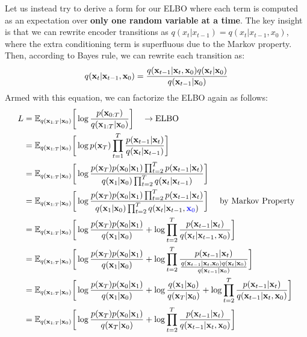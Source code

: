 Let us instead try to derive a form for our ELBO where each term is computed as an expectation over \textbf{only one random variable at a time}. The key insight is that we can rewrite encoder transitions as $q(x_t|x_{t-1}) = q(x_t|x_{t-1}, x_0)$, where the extra conditioning term is superfluous due to the Markov property. Then, according to Bayes rule, we can rewrite each transition as:
\begin{align*}
	q({\mathbf{x}}_t|{\mathbf{x}}_{t-1}, {\mathbf{x}}_0)= \frac{q({\mathbf{x}}_{t-1}|{\mathbf{x}}_t, {\mathbf{x}}_0)q({\mathbf{x}}_t| {\mathbf{x}}_0)}{q({\mathbf{x}}_{t-1}| {\mathbf{x}}_0)} 
\end{align*}
Armed with this equation, we can factorize the ELBO again as follows:
\begin{align}
		L &= \mathbb{E}_{q(\rvx_{1:T}|\rvx_0)}\bigg[\log\frac{p(\rvx_{0:T})}{q(\rvx_{1:T}|\rvx_0)}\bigg] \quad \to \textrm{ELBO}\\		
		&= \mathbb{E}_{q(\rvx_{1:T}|\rvx_0)}\bigg[\log p(\rvx_T)\prod_{t=1}^T\frac{p(\rvx_{t-1}|\rvx_t)}{q(\rvx_{t}|\rvx_{t-1})}\bigg]\\
		&= \mathbb{E}_{q(\rvx_{1:T}|\rvx_0)}\bigg[\log \frac{p(\rvx_T)p(\rvx_0|\rvx_{1})\prod_{t=2}^{T} p(\rvx_{t-1}|\rvx_{t})}{q(\rvx_1|\rvx_{0})\prod_{t=2}^{T}  q(\rvx_{t}|\rvx_{t-1})}\bigg]\\
		&= \mathbb{E}_{q(\rvx_{1:T}|\rvx_0)}\bigg[\log \frac{p(\rvx_T)p(\rvx_0|\rvx_{1})\prod_{t=2}^{T} p(\rvx_{t-1}|\rvx_{t})}{q(\rvx_1|\rvx_{0})\prod_{t=2}^{T}  q(\rvx_{t}|\rvx_{t-1}, \blue{\rvx_0})}\bigg] \quad \textrm{ by Markov Property}\\
		&= \mathbb{E}_{q(\rvx_{1:T}|\rvx_0)}\bigg[\log \frac{p(\rvx_T)p(\rvx_0|\rvx_{1})}{q(\rvx_1|\rvx_{0})}+\log \prod_{t=2}^{T}\frac{ p(\rvx_{t-1}|\rvx_{t})}{q(\rvx_{t}|\rvx_{t-1}, \rvx_0)}\bigg]\\
		&= \mathbb{E}_{q(\rvx_{1:T}|\rvx_0)}\bigg[\log \frac{p(\rvx_T)p(\rvx_0|\rvx_{1})}{q(\rvx_1|\rvx_{0})}+\log \prod_{t=2}^{T}\frac{ p(\rvx_{t-1}|\rvx_{t})}{\frac{q(\rvx_{t-1}|\rvx_t, \rvx_0)q(\rvx_t| \rvx_0)}{q(\rvx_{t-1}| \rvx_0)}}\bigg]\\
		&= \mathbb{E}_{q(\rvx_{1:T}|\rvx_0)}\bigg[\log \frac{p(\rvx_T)p(\rvx_0|\rvx_{1})}{q(\rvx_1|\rvx_{0})}+\log \frac{q(\rvx_1|\rvx_0)}{q(\rvx_T|\rvx_0)}+\log \prod_{t=2}^{T}\frac{ p(\rvx_{t-1}|\rvx_{t})}{q(\rvx_{t-1}|\rvx_t, \rvx_0)}\bigg]\\
		&= \mathbb{E}_{q(\rvx_{1:T}|\rvx_0)}\bigg[\log \frac{p(\rvx_T)p(\rvx_0|\rvx_{1})}{q(\rvx_T|\rvx_{0})}+\log \prod_{t=2}^{T}\frac{ p(\rvx_{t-1}|\rvx_{t})}{q(\rvx_{t-1}|\rvx_t, \rvx_0)}\bigg]\\

\end{align}

